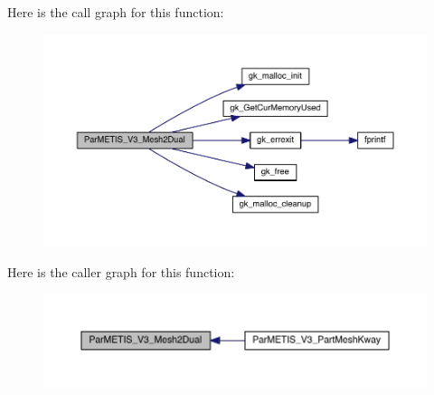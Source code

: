 Here is the call graph for this function\+:\nopagebreak
\begin{figure}[H]
\begin{center}
\leavevmode
\includegraphics[width=350pt]{a00930_ab2b3727a0cfbdf8b75768c33487fa9f4_cgraph}
\end{center}
\end{figure}
Here is the caller graph for this function\+:\nopagebreak
\begin{figure}[H]
\begin{center}
\leavevmode
\includegraphics[width=350pt]{a00930_ab2b3727a0cfbdf8b75768c33487fa9f4_icgraph}
\end{center}
\end{figure}
